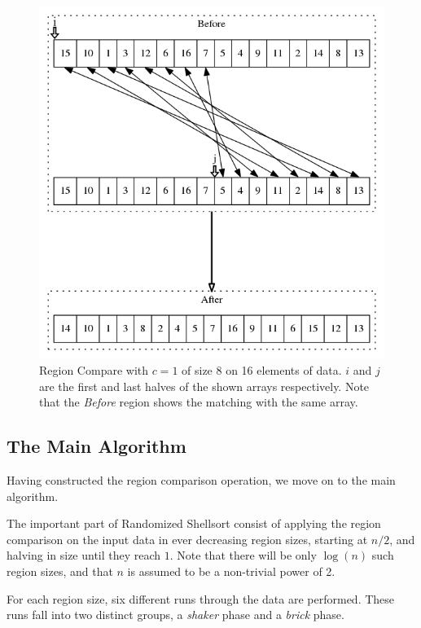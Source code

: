 \begin{figure}
\center
\includegraphics[width=\textwidth]{Graphics/regcmp.png}
\caption{Region Compare with $c=1$ of size 8 on 16 elements of data. $i$ and $j$ are the first and last halves of the shown arrays respectively. Note that the \emph{Before} region shows the matching with the same array.}
\label{fig:CompareExchange}
\end{figure}

\subsection{The Main Algorithm}

Having constructed the region comparison operation, we move on to the main algorithm.

The important part of Randomized Shellsort consist of applying the region comparison on the input data in ever decreasing region sizes, starting at $n/2$, and halving in size until they reach $1$. Note that there will be only $\log(n)$ such region sizes, and that $n$ is assumed to be a non-trivial power of 2.

For each region size, six different runs through the data are performed. These runs fall into two distinct groups, a \emph{shaker} phase and a \emph{brick} phase.

